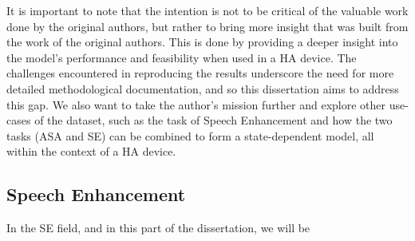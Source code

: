 \documentclass[logo,bsc,singlespacing,parskip,online]{infthesis}
\begin{document}
It is important to note that the intention is not to 
be critical of the valuable work done by the original authors, 
but rather to bring more insight that was built from the work of the original authors.
This is done by providing a deeper insight into the model's performance 
and feasibility when used in a HA device. The challenges encountered 
in reproducing the results underscore the need for more 
detailed methodological documentation, and so this dissertation aims 
to address this gap. We also want to take the author's 
mission further and explore other use-cases of the dataset, 
such as the task of Speech Enhancement and how the two tasks 
(ASA and SE) can be combined to form a state-dependent model,
all within the context of a HA device.
\newpage

\subsection{Speech Enhancement}
In the SE field, and in this part of the dissertation, we will be 

\end{document}
